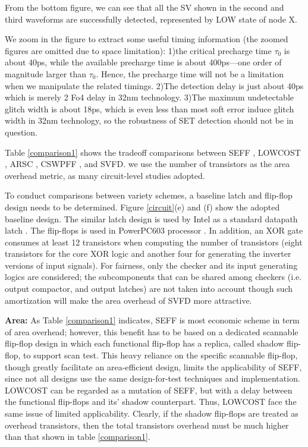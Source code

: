 From the bottom figure, we can see that all the SV shown in the second and third waveforms are successfully detected, represented by LOW state of node X.

We zoom in the figure to extract some useful timing information (the zoomed figures are omitted due to space limitation): 1)the critical precharge time $\tau_0$ is about 40ps, while the available precharge time is about 400ps---one order of magnitude larger than $\tau_0$. Hence, the precharge time will not be a limitation when we manipulate the related timings. 2)The detection delay is just about 40ps which is merely 2 Fo4 delay in 32nm technology. 3)The maximum undetectable glitch width is about 18ps, which is even less than most soft error induce glitch width in 32nm technology, so the robustness of SET detection should not be in question.

Table \ref{comparison1} shows the tradeoff comparisons between SEFF \cite{Mitra_C05}, LOWCOST \cite{lowcost_date07}, ARSC \cite{failure_prediction_07}, CSWPFF \cite{CWSP_DATE08}, and SVFD. we use the number of transistors as the area overhead metric, as many circuit-level studies adopted.

To conduct comparisons between variety schemes, a baseline latch and flip-flop design needs to be determined. Figure \ref{circuit}(e) and (f) show the adopted baseline design. The similar latch design is used by Intel as a standard datapath latch \cite{Latch_01}. The flip-flops is used in PowerPC603 processor \cite{Flipflop_94}. In addition, an XOR gate consumes at least 12 transistors when computing the number of transistors (eight transistors for the core XOR logic and another four for generating the inverter versions of input signals). For fairness, only the checker and its input generating logics are considered; the subcomponents that can be shared among checkers (i.e. output compactor, and output latches) are not taken into account though such amortization will make the area overhead of SVFD more attractive.

{\bf Area:} As Table \ref{comparison1} indicates, SEFF is most economic scheme in term of area overhead; however, this benefit has to be based on a dedicated scannable flip-flop design in which each functional flip-flop has a replica, called shadow flip-flop,  to support scan test. This heavy reliance on the specific scannable flip-flop, though greatly facilitate an area-efficient design, limits the applicability of SEFF, since not all designs use the same design-for-test techniques and implementation. LOWCOST can be regarded as a mutation of SEFF, but with a delay between the functional flip-flops and its' shadow counterpart. Thus, LOWCOST face the same issue of limited applicability. Clearly, if the shadow flip-flops are treated as overhead transistors, then the total transistors overhead must be much higher than that shown in table \ref{comparison1}.

